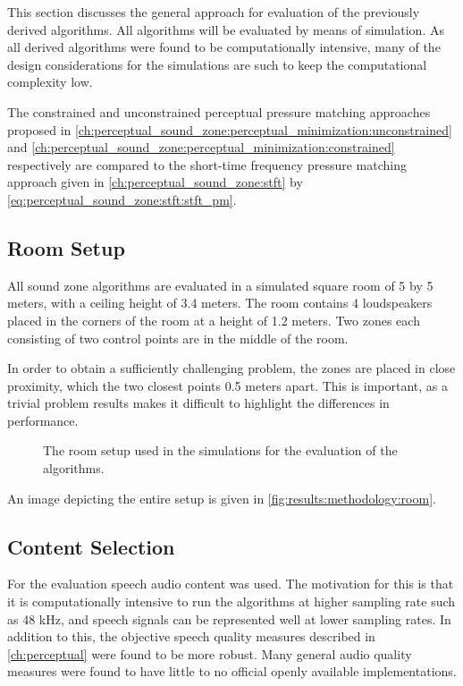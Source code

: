 This section discusses the general approach for evaluation of the previously derived algorithms.
All algorithms will be evaluated by means of simulation. 
As all derived algorithms were found to be computationally intensive, many of the design considerations for the simulations
are such to keep the computational complexity low.

The constrained and unconstrained perceptual pressure matching approaches proposed in \autoref{ch:perceptual_sound_zone:perceptual_minimization:unconstrained}
and \autoref{ch:perceptual_sound_zone:perceptual_minimization:constrained} respectively are compared to the short-time frequency pressure matching approach
given in \autoref{ch:perceptual_sound_zone:stft} by \autoref{eq:perceptual_sound_zone:stft:stft_pm}.

\subsection{Room Setup}
All sound zone algorithms are evaluated in a simulated square room of 5 by 5 meters, with a ceiling height of 3.4 meters.
The room contains 4 loudspeakers placed in the corners of the room at a height of 1.2 meters.
Two zones each consisting of two control points are in the middle of the room.

In order to obtain a sufficiently challenging problem, the zones are placed in close proximity, which the two closest points 0.5 meters apart.
This is important, as a trivial problem results makes it difficult to highlight the differences in performance.

\begin{figure}[]
    \centering
    \scalebox{1.0}{}
    \caption{The room setup used in the simulations for the evaluation of the algorithms.}
    \label{fig:results:methodology:room}
\end{figure}
An image depicting the entire setup is given in \autoref{fig:results:methodology:room}.

\subsection{Content Selection}
For the evaluation speech audio content was used.
The motivation for this is that it is computationally intensive to run the algorithms at higher sampling rate such as 48 kHz, and speech signals 
can be represented well at lower sampling rates.
In addition to this, the objective speech quality measures described in \autoref{ch:perceptual} were found to be more robust.
Many general audio quality measures were found to have little to no official openly available implementations.

